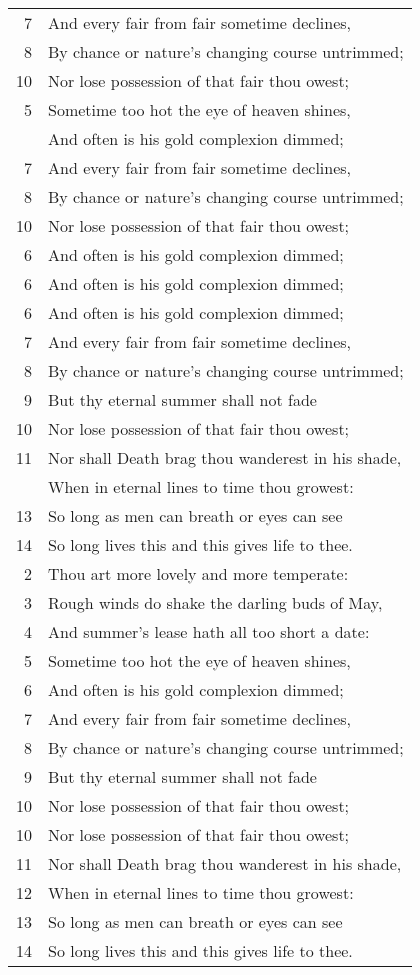 \documentclass[paper=6in:9in,pagesize=pdftex,
               headinclude=on,footinclude=on,12pt]{scrbook}
\begin{document}
\begin{longtable}[p]{ r l }
7 & And every fair from fair sometime declines, \\
8 & By chance or nature's changing course untrimmed; \\
10 & Nor lose possession of that fair thou owest; \\
5 & Sometime too hot the eye of heaven shines, \\
 & And often is his gold complexion dimmed; \\
7 & And every fair from fair sometime declines, \\
8 & By chance or nature's changing course untrimmed; \\
10 & Nor lose possession of that fair thou owest; \\
6 & And often is his gold complexion dimmed; \\
6 & And often is his gold complexion dimmed; \\
6 & And often is his gold complexion dimmed; \\
7 & And every fair from fair sometime declines, \\
8 & By chance or nature's changing course untrimmed; \\
9 & But thy eternal summer shall not fade \\
10 & Nor lose possession of that fair thou owest; \\
11 & Nor shall Death brag thou wanderest in his shade, \\
 & When in eternal lines to time thou growest: \\
13 & So long as men can breath or eyes can see \\
14 & So long lives this and this gives life to thee. \\
2 & Thou art more lovely and more temperate: \\
3 & Rough winds do shake the darling buds of May, \\
4 & And summer's lease hath all too short a date: \\
5 & Sometime too hot the eye of heaven shines, \\
6 & And often is his gold complexion dimmed; \\
7 & And every fair from fair sometime declines, \\
8 & By chance or nature's changing course untrimmed; \\
9 & But thy eternal summer shall not fade \\
10 & Nor lose possession of that fair thou owest; \\
10 & Nor lose possession of that fair thou owest; \\
11 & Nor shall Death brag thou wanderest in his shade, \\
12 & When in eternal lines to time thou growest: \\
13 & So long as men can breath or eyes can see \\
14 & So long lives this and this gives life to thee. \\
\end{longtable}
\end{document}
